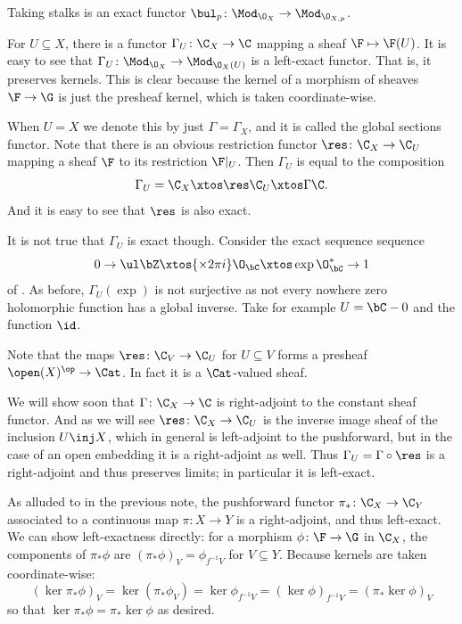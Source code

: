 \bcoro

    Taking stalks is an exact functor $\bul_p \colon \Mod_{\O_X} \to \Mod_{\O_{X,p}}$.

\ecoro

\bexam

    For $U\subseteq X$, there is a functor $\Gamma_U\colon\C_X\to\C$ mapping a sheaf $\F\mapsto\F(U)$.
    It is easy to see that $\Gamma_U\colon\Mod_{\O_X}\to\Mod_{\O_X(U)}$ is a left-exact functor.
    That is, it preserves kernels.
    This is clear because the kernel of a morphism of sheaves $\F\to\G$ is just the presheaf kernel, which is taken
    coordinate-wise.

    When $U=X$ we denote this by just $\Gamma=\Gamma_X$, and it is called the {\emphcolor global sections functor}.
    Note that there is an obvious restriction functor $\res\colon\C_X\to\C_U$ mapping a sheaf $\F$ to its restriction
    $\F|_U$.
    Then $\Gamma_U$ is equal to the composition
    $$ \Gamma_U = \C_X \xtos\res \C_U \xtos\Gamma \C . $$
    And it is easy to see that $\res$ is also exact.

    It is not true that $\Gamma_U$ is exact though.
    Consider the exact sequence sequence
    $$ 0 \to \ul\bZ \xtos{\times2\pi i}\O_\bC\xtos\exp\O_\bC^*\to1 $$
    of .
    As before, $\Gamma_U(\exp)$ is not surjective as not every nowhere zero holomorphic function has a global inverse.
    Take for example $U=\bC-0$ and the function $\id$.

\eexam

\bnote

    Note that the maps $\res\colon\C_V\to\C_U$ for $U\subseteq V$ forms a presheaf $\open(X)^\op\to\Cat$.
    In fact it is a $\Cat$-valued sheaf.

\enote

\bnote

    We will show soon that $\Gamma\colon\C_X\to\C$ is right-adjoint to the constant sheaf functor.
    And as we will see $\res\colon\C_X\to\C_U$ is the inverse image sheaf of the inclusion $U\inj X$, which in general is
    left-adjoint to the pushforward, but in the case of an open embedding it is a right-adjoint as well.
    Thus $\Gamma_U=\Gamma\circ\res$ is a right-adjoint and thus preserves limits; in particular it is left-exact.

\enote

\bexam

    As alluded to in the previous note, the pushforward functor $\pi_*\colon\C_X\to\C_Y$ associated to a continuous
    map $\pi\colon X\to Y$ is a right-adjoint, and thus left-exact.
    We can show left-exactness directly: for a morphism $\phi\colon\F\to\G$ in $\C_X$, the components of $\pi_*\phi$
    are $(\pi_*\phi)_V=\phi_{f^{-1}V}$ for $V\subseteq Y$.
    Because kernels are taken coordinate-wise:
    $$ (\ker\pi_*\phi)_V = \ker(\pi_*\phi_V) = \ker\phi_{f^{-1}V} = (\ker\phi)_{f^{-1}V} = (\pi_*\ker\phi)_V $$
    so that $\ker\pi_*\phi=\pi_*\ker\phi$ as desired.

